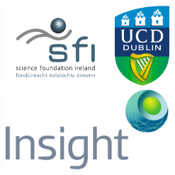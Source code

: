 \documentclass[british,12pt]{phdthesis}
\begin{document}
\singlespacing


\newpage
\phantom{a}

\begin{figure}[b]
  \centering
	\includegraphics[height=3cm]{graphics/logos/SFI.png} %
	\hfill
	\includegraphics[height=3cm]{graphics/logos/ucd_brandmark_colour.jpg}%
	\hfill
	\includegraphics[height=3cm]{graphics/logos/insightlogo.pdf} %
\end{figure}
\end{document}
